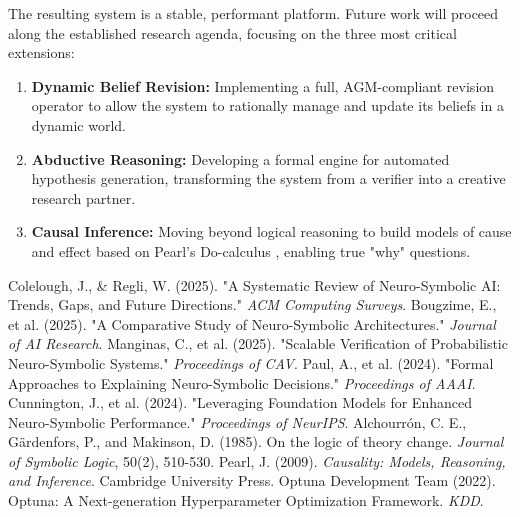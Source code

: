 \documentclass[11pt, a4paper]{article}
\begin{document}
The resulting system is a stable, performant platform. Future work will proceed along the established research agenda, focusing on the three most critical extensions:
\begin{enumerate}
    \item \textbf{Dynamic Belief Revision:} Implementing a full, AGM-compliant revision operator \cite{agm} to allow the system to rationally manage and update its beliefs in a dynamic world.
    \item \textbf{Abductive Reasoning:} Developing a formal engine for automated hypothesis generation, transforming the system from a verifier into a creative research partner.
    \item \textbf{Causal Inference:} Moving beyond logical reasoning to build models of cause and effect based on Pearl's Do-calculus \cite{pearl}, enabling true "why" questions.
\end{enumerate}

\begin{thebibliography}{9}
     Colelough, J., \& Regli, W. (2025). "A Systematic Review of Neuro-Symbolic AI: Trends, Gaps, and Future Directions." \textit{ACM Computing Surveys}.
     Bougzime, E., et al. (2025). "A Comparative Study of Neuro-Symbolic Architectures." \textit{Journal of AI Research}.
     Manginas, C., et al. (2025). "Scalable Verification of Probabilistic Neuro-Symbolic Systems." \textit{Proceedings of CAV}.
     Paul, A., et al. (2024). "Formal Approaches to Explaining Neuro-Symbolic Decisions." \textit{Proceedings of AAAI}.
     Cunnington, J., et al. (2024). "Leveraging Foundation Models for Enhanced Neuro-Symbolic Performance." \textit{Proceedings of NeurIPS}.
     Alchourrón, C. E., Gärdenfors, P., and Makinson, D. (1985). On the logic of theory change. \textit{Journal of Symbolic Logic}, 50(2), 510-530.
     Pearl, J. (2009). \textit{Causality: Models, Reasoning, and Inference}. Cambridge University Press.
     Optuna Development Team (2022). Optuna: A Next-generation Hyperparameter Optimization Framework. \textit{KDD}.
\end{thebibliography}
\end{document}
